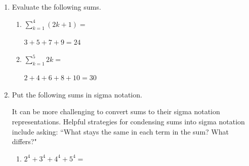 \documentclass{article}
\begin{document}
\begin{enumerate}
\begin{enumerate}
\begin{solution}
Examples of other reasonable sums include $\displaystyle \sum_{k=0}^{119} v_{k+1}\cdot5$ or $\displaystyle \sum_{k=1}^{120} v_{k}\cdot5$. 
\end{solution}
\vfill 
\end{enumerate}




  

  \item
    Evaluate the following sums.
    \begin{enumerate}
    \item
      \begin{problem}
        $\displaystyle \sum_{k=1}^4 (2k+1)=$
      \end{problem}\vfill
    \begin{solution}
        $3+5+7+9=24$
      \end{solution}

    \item
      \begin{problem}
        $\displaystyle \sum_{k=1}^5 2k = $
      \end{problem}\vfill
      \begin{solution}
        $2+4+6+8+10=30$
      \end{solution}

    \end{enumerate}
  \item Put the following sums in sigma notation. 
\begin{workshop}
    It can be more challenging to convert sums to their sigma notation representations. Helpful strategies for condensing sums into sigma notation include asking: ``What stays the same in each term in the sum? What differs?"
\end{workshop}
    \begin{enumerate}
    \item
      \begin{problem}
        $ 2^4 + 3^4 + 4^4 + 5^4 = $
      \end{problem}\vfill


\end{enumerate}
\end{enumerate}
\end{document}
